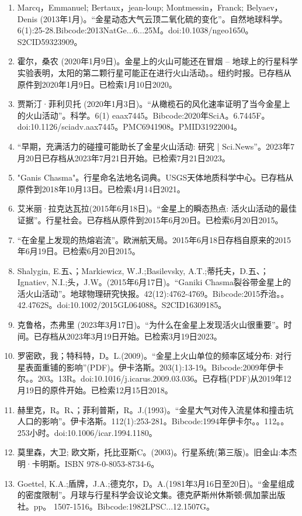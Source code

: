 \begin{enumerate}
\item Marcq，Emmanuel; Bertaux，jean-loup; Montmessin，Franck; Belyaev，Denis (2013年1月)。“金星动态大气云顶二氧化硫的变化”。自然地球科学。6(1):25-28.Bibcode:2013NatGe...6...25M。doi:10.1038/ngeo1650。S2CID59323909。 
\item 霍尔，桑农 (2020年1月9日)。金星上的火山可能还在冒烟 -- 地球上的行星科学实验表明，太阳的第二颗行星可能正在进行火山活动。。纽约时报。已存档从原件到2020年1月9日。已检索1月10日2020。
\item 贾斯汀·菲利贝托 (2020年1月3日)。“从橄榄石的风化速率证明了当今金星上的火山活动”。科学。6(1) eaax7445。Bibcode:2020年SciA。6.7445F。doi:10.1126/sciadv.aax7445。PMC6941908。PMID31922004。  
\item “早期，充满活力的碰撞可能助长了金星火山活动: 研究 | Sci.News”。2023年7月20日已存档从2023年7月21日开始。已检索7月21日2023。
\item "Ganis Chasma"。行星命名法地名词典。USGS天体地质科学中心。已存档从原件到2018年10月13日。已检索4月14日2021。
\item 艾米丽·拉克达瓦拉(2015年6月18日)。“金星上的瞬态热点: 活火山活动的最佳证据”。行星社会。已存档从原件到2015年6月20日。已检索6月20日2015。
\item “在金星上发现的热熔岩流”。欧洲航天局。2015年6月18日存档自原来的2015年6月19日。已检索6月20日2015。
\item Shalygin, E.五、；Markiewicz, W.J.;Basilevsky, A.T.;蒂托夫，D.五、；Ignatiev, N.I.;头，J.W。(2015年6月17日)。“Ganiki Chasma裂谷带金星上的活火山活动”。地球物理研究快报。42(12):4762-4769。Bibcode:2015乔治。。42.4762S。doi:10.1002/2015GL064088。S2CID16309185。 
\item 克鲁格，杰弗里 (2023年3月17日)。“为什么在金星上发现活火山很重要”。时间。已存档从2023年3月19日开始。已检索3月19日2023。
\item 罗密欧，我；特科特，D。L.(2009)。“金星上火山单位的频率区域分布: 对行星表面重铺的影响”(PDF)。伊卡洛斯。203(1):13-19。Bibcode:2009年伊卡尔。。203。13R。doi:10.1016/j.icarus.2009.03.036。已存档(PDF)从2019年12月19日的原件开始。已检索12月15日2018。
\item 赫里克，R。R、；菲利普斯，R。J.(1993)。“金星大气对传入流星体和撞击坑人口的影响”。伊卡洛斯。112(1):253-281。Bibcode:1994年伊卡尔。。112。。253小时。doi:10.1006/icar.1994.1180。
\item 莫里森，大卫; 欧文斯，托比亚斯C。(2003)。行星系统(第三版)。旧金山:本杰明·卡明斯。ISBN 978-0-8053-8734-6。
\item Goettel, K.A.;盾牌，J.A.;德克尔，D。A.(1981年3月16日至20日)。“金星组成的密度限制”。月球与行星科学会议论文集。德克萨斯州休斯顿:佩加蒙出版社。pp。 1507-1516。Bibcode:1982LPSC...12.1507G。

\end{enumerate}
